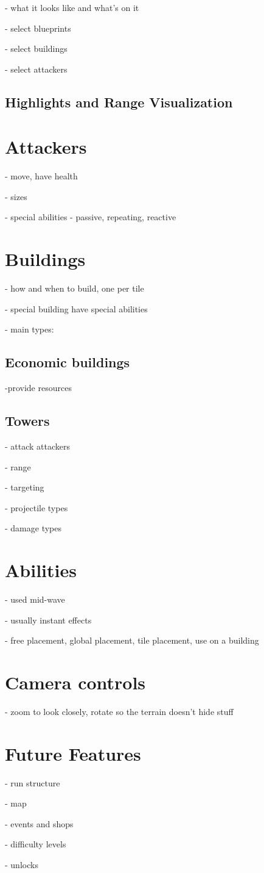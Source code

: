 - what it looks like and what's on it

- select blueprints

- select buildings

- select attackers

\subsection{Highlights and Range Visualization}

\section{Attackers}

- move, have health

- sizes

- special abilities - passive, repeating, reactive

\section{Buildings}

- how and when to build, one per tile

- special building have special abilities

- main types:

\subsection{Economic buildings}

-provide resources

\subsection{Towers}

- attack attackers

- range

- targeting

- projectile types

- damage types

\section{Abilities}

- used mid-wave

- usually instant effects

- free placement, global placement, tile placement, use on a building

\section{Camera controls}

- zoom to look closely, rotate so the terrain doesn't hide stuff

\section{Future Features}

- run structure

- map

- events and shops

- difficulty levels

- unlocks
